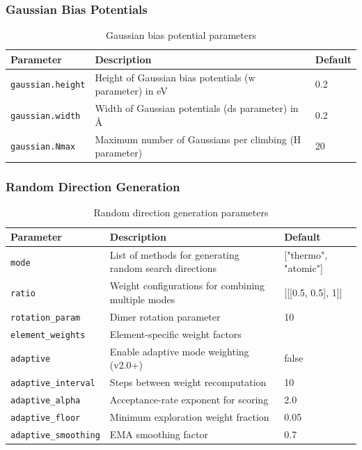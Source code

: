 \documentclass[11pt,a4paper]{article}
\begin{document}
\subsubsection{Gaussian Bias Potentials}
\begin{table}[h]
\centering
\begin{tabular}{lll}
\toprule
\textbf{Parameter} & \textbf{Description} & \textbf{Default} \\
\midrule
\texttt{gaussian.height} & Height of Gaussian bias potentials (w parameter) in eV & 0.2 \\
\texttt{gaussian.width} & Width of Gaussian potentials (ds parameter) in \AA & 0.2 \\
\texttt{gaussian.Nmax} & Maximum number of Gaussians per climbing (H parameter) & 20 \\
\bottomrule
\end{tabular}
\caption{Gaussian bias potential parameters}
\end{table}

\subsubsection{Random Direction Generation}
\begin{table}[h]
\centering
\begin{tabular}{lll}
\toprule
\textbf{Parameter} & \textbf{Description} & \textbf{Default} \\
\midrule
\texttt{mode} & List of methods for generating random search directions & ["thermo", "atomic"] \\
\texttt{ratio} & Weight configurations for combining multiple modes & [[[0.5, 0.5], 1]] \\
\texttt{rotation\_param} & Dimer rotation parameter & 10 \\
\texttt{element\_weights} & Element-specific weight factors & {} \\
\texttt{adaptive} & Enable adaptive mode weighting (v2.0+) & false \\
\texttt{adaptive\_interval} & Steps between weight recomputation & 10 \\
\texttt{adaptive\_alpha} & Acceptance-rate exponent for scoring & 2.0 \\
\texttt{adaptive\_floor} & Minimum exploration weight fraction & 0.05 \\
\texttt{adaptive\_smoothing} & EMA smoothing factor & 0.7 \\
\bottomrule
\end{tabular}
\caption{Random direction generation parameters}
\end{table}
\end{document}
